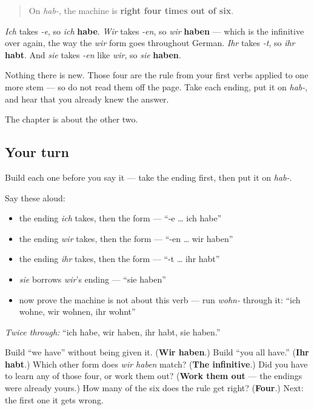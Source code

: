 \begin{grammarlens}[title={Grammar Lens: four forms you already knew}]
\begin{quote}
On \emph{hab-}, the machine is \textbf{right four times out of six}.
\end{quote}

\emph{Ich} takes \emph{-e}, so \emph{ich} \textbf{habe}. \emph{Wir} takes \emph{-en}, so \emph{wir} \textbf{haben} — which is the infinitive over again, the way the \emph{wir} form goes throughout German. \emph{Ihr} takes \emph{-t}, so \emph{ihr} \textbf{habt}. And \emph{sie} takes \emph{-en} like \emph{wir}, so \emph{sie} \textbf{haben}.

Nothing there is new. Those four are the rule from your first verbs applied to one more stem — so do not read them off the page. Take each ending, put it on \emph{hab-}, and hear that you already knew the answer.

The chapter is about the other two.
\end{grammarlens}

\subsection*{Your turn}
Build each one before you say it — take the ending first, then put it on \emph{hab-}.

Say these aloud:

\begin{itemize}
\raggedright
  \item the ending \emph{ich} takes, then the form — \textquotedblleft{}-e … ich habe\textquotedblright{}
  \item the ending \emph{wir} takes, then the form — \textquotedblleft{}-en … wir haben\textquotedblright{}
  \item the ending \emph{ihr} takes, then the form — \textquotedblleft{}-t … ihr habt\textquotedblright{}
  \item \emph{sie} borrows \emph{wir}'s ending — \textquotedblleft{}sie haben\textquotedblright{}
  \item now prove the machine is not about this verb — run \emph{wohn-} through it: \textquotedblleft{}ich wohne, wir wohnen, ihr wohnt\textquotedblright{}
\end{itemize}

\emph{Twice through:} \textquotedblleft{}ich habe, wir haben, ihr habt, sie haben.\textquotedblright{}

\begin{tcolorbox}[breakable,colback=teal!4,colframe=teal!35!black,title={Before you move on}]
Build \textquotedblleft{}we have\textquotedblright{} without being given it. (\textbf{Wir haben}.) Build \textquotedblleft{}you all have.\textquotedblright{} (\textbf{Ihr habt}.) Which other form does \emph{wir haben} match? (\textbf{The infinitive}.) Did you have to learn any of those four, or work them out? (\textbf{Work them out} — the endings were already yours.) How many of the six does the rule get right? (\textbf{Four}.) Next: the first one it gets wrong.
\end{tcolorbox}
